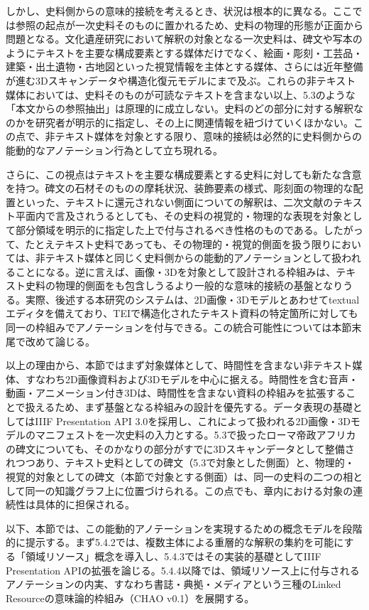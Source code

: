 しかし、史料側からの意味的接続を考えるとき、状況は根本的に異なる。ここでは参照の起点が一次史料そのものに置かれるため、史料の物理的形態が正面から問題となる。文化遺産研究において解釈の対象となる一次史料は、碑文や写本のようにテキストを主要な構成要素とする媒体だけでなく、絵画・彫刻・工芸品・建築・出土遺物・古地図といった視覚情報を主体とする媒体、さらには近年整備が進む3Dスキャンデータや構造化復元モデルにまで及ぶ。これらの非テキスト媒体においては、史料そのものが可読なテキストを含まない以上、5.3のような「本文からの参照抽出」は原理的に成立しない。史料のどの部分に対する解釈なのかを研究者が明示的に指定し、その上に関連情報を紐づけていくほかない。この点で、非テキスト媒体を対象とする限り、意味的接続は必然的に史料側からの能動的なアノテーション行為として立ち現れる。

さらに、この視点はテキストを主要な構成要素とする史料に対しても新たな含意を持つ。碑文の石材そのものの摩耗状況、装飾要素の様式、彫刻面の物理的な配置といった、テキストに還元されない側面についての解釈は、二次文献のテキスト平面内で言及されうるとしても、その史料の視覚的・物理的な表現を対象として部分領域を明示的に指定した上で付与されるべき性格のものである。したがって、たとえテキスト史料であっても、その物理的・視覚的側面を扱う限りにおいては、非テキスト媒体と同じく史料側からの能動的アノテーションとして扱われることになる。逆に言えば、画像・3Dを対象として設計される枠組みは、テキスト史料の物理的側面をも包含しうるより一般的な意味的接続の基盤となりうる。実際、後述する本研究のシステムは、2D画像・3Dモデルとあわせてtextualエディタを備えており、TEIで構造化されたテキスト資料の特定箇所に対しても同一の枠組みでアノテーションを付与できる。この統合可能性については本節末尾で改めて論じる。

以上の理由から、本節ではまず対象媒体として、時間性を含まない非テキスト媒体、すなわち2D画像資料および3Dモデルを中心に据える。時間性を含む音声・動画・アニメーション付き3Dは、時間性を含まない資料の枠組みを拡張することで扱えるため、まず基盤となる枠組みの設計を優先する。データ表現の基礎としてはIIIF Presentation API 3.0を採用し、これによって扱われる2D画像・3Dモデルのマニフェストを一次史料の入力とする。5.3で扱ったローマ帝政アフリカの碑文についても、そのかなりの部分がすでに3Dスキャンデータとして整備されつつあり、テキスト史料としての碑文（5.3で対象とした側面）と、物理的・視覚的対象としての碑文（本節で対象とする側面）は、同一の史料の二つの相として同一の知識グラフ上に位置づけられる。この点でも、章内における対象の連続性は具体的に担保される。

以下、本節では、この能動的アノテーションを実現するための概念モデルを段階的に提示する。まず5.4.2では、複数主体による重層的な解釈の集約を可能にする「領域リソース」概念を導入し、5.4.3ではその実装的基礎としてIIIF Presentation APIの拡張を論じる。5.4.4以降では、領域リソース上に付与されるアノテーションの内実、すなわち書誌・典拠・メディアという三種のLinked Resourceの意味論的枠組み（CHAO v0.1）を展開する。

